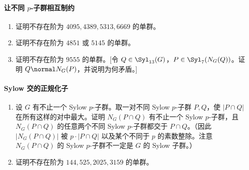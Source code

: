 \paragraph{让不同 $p$-子群相互制约}
\begin{enumerate}[label=\arabic*.,resume]
  \item 证明不存在阶为 $4095,4389,5313,6669$ 的单群。
  \item 证明不存在阶为 $4851$ 或 $5145$ 的单群。
  \item 证明不存在阶为 $9555$ 的单群。[令 $Q\in\Syl_{13}(G)$，$P\in\Syl_7(N_G(Q))$。证明 $Q\normal N_G(P)$，并说明为何矛盾。]
\end{enumerate}

\paragraph{Sylow 交的正规化子}
\begin{enumerate}[label=\arabic*.,resume]
  \item 设 $G$ 有不止一个 Sylow $p$-子群。取一对不同 Sylow $p$-子群 $P,Q$，使 $|P\cap Q|$ 在所有这样的对中最大。证明 $N_G(P\cap Q)$ 有不止一个 Sylow $p$-子群，且 $N_G(P\cap Q)$ 的任意两个不同 Sylow $p$-子群都交于 $P\cap Q$。（因此 $|N_G(P\cap Q)|$ 被 $p\cdot |P\cap Q|$ 以及某个不同于 $p$ 的素数整除。注意 $N_G(P\cap Q)$ 的 Sylow $p$-子群不一定是 $G$ 的 Sylow 子群。）
  \item 证明不存在阶为 $144,525,2025,3159$ 的单群。
\end{enumerate}

